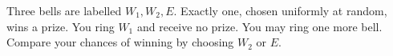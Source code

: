 Three bells are labelled $W_1,W_2,E$. Exactly one, chosen uniformly at random, wins a prize. You ring $W_1$ and receive no prize. You may ring one more bell. Compare your chances of winning by choosing $W_2$ or $E$.
